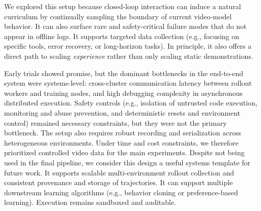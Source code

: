 We explored this setup because closed-loop interaction can induce a natural curriculum by continually sampling the boundary of current video-model behavior.
It can also surface rare and safety-critical failure modes that do not appear in offline logs.
It supports targeted data collection (e.g., focusing on specific tools, error recovery, or long-horizon tasks).
In principle, it also offers a direct path to scaling \emph{experience} rather than only scaling static demonstrations.

Early trials showed promise, but the dominant bottlenecks in the end-to-end system were systems-level: cross-cluster communication latency between rollout workers and training nodes, and high debugging complexity in asynchronous distributed execution.
Safety controls (e.g., isolation of untrusted code execution, monitoring and abuse prevention, and deterministic resets and environment control) remained necessary constraints, but they were not the primary bottleneck.
The setup also requires robust recording and serialization across heterogeneous environments.
Under time and cost constraints, we therefore prioritized controlled video data for the main experiments. 
Despite not being used in the final pipeline, we consider this design a useful systems template for future work.
It supports scalable multi-environment rollout collection and consistent provenance and storage of trajectories.
It can support multiple downstream learning algorithms (e.g., behavior cloning or preference-based learning).
Execution remains sandboxed and auditable.
